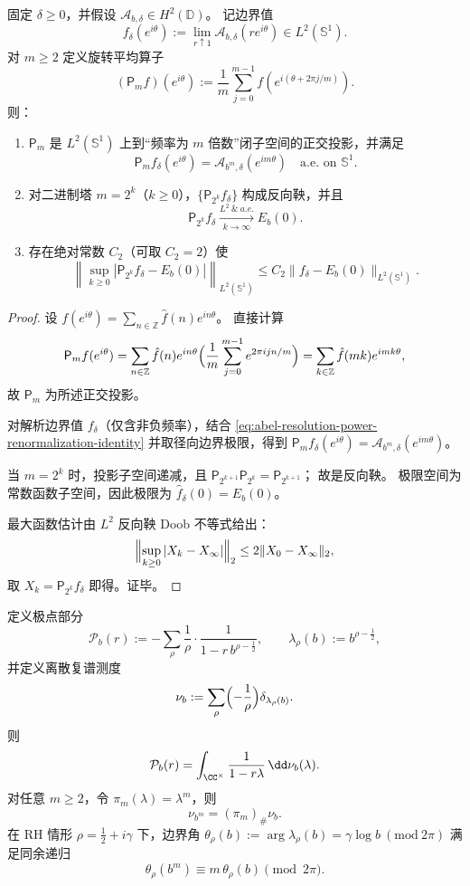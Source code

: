 \begin{theorem}\label{thm:abel-hardy-projection-tower-reverse-martingale}
固定 \(\delta\ge 0\)，并假设 \(\mathcal A_{b,\delta}\in H^2(\mathbb D)\)。
记边界值
\[
f_\delta(e^{i\theta}):=\lim_{r\uparrow 1}\mathcal A_{b,\delta}(re^{i\theta})\in L^2(\mathbb S^1).
\]
对 \(m\ge 2\) 定义旋转平均算子
\[
(\mathsf P_m f)(e^{i\theta})
:=\frac1m\sum_{j=0}^{m-1}f\!\left(e^{i(\theta+2\pi j/m)}\right).
\]
则：
\begin{enumerate}
  \item \(\mathsf P_m\) 是 \(L^2(\mathbb S^1)\) 上到“频率为 \(m\) 倍数”闭子空间的正交投影，并满足
  \[
  \mathsf P_m f_\delta(e^{i\theta})=\mathcal A_{b^m,\delta}(e^{im\theta})
  \quad\text{a.e. on }\mathbb S^1.
  \]
  \item 对二进制塔 \(m=2^k\)（\(k\ge 0\)），\(\{\mathsf P_{2^k}f_\delta\}\) 构成反向鞅，并且
  \[
  \mathsf P_{2^k}f_\delta \xrightarrow[k\to\infty]{L^2\ \&\ a.e.} E_b(0).
  \]
  \item 存在绝对常数 \(C_2\)（可取 \(C_2=2\)）使
  \[
  \left\|\sup_{k\ge 0}\left|\mathsf P_{2^k}f_\delta-E_b(0)\right|\right\|_{L^2(\mathbb S^1)}
  \le
  C_2\|f_\delta-E_b(0)\|_{L^2(\mathbb S^1)}.
  \]
\end{enumerate}
\end{theorem}

\begin{proof}
设
\(
f(e^{i\theta})=\sum_{n\in\mathbb Z}\hat f(n)e^{in\theta}
\)。
直接计算
\[
\mathsf P_m f(e^{i\theta})
=\sum_{n\in\mathbb Z}\hat f(n)e^{in\theta}
\Bigl(\frac1m\sum_{j=0}^{m-1}e^{2\pi ijn/m}\Bigr)
=\sum_{k\in\mathbb Z}\hat f(mk)e^{imk\theta},
\]
故 \(\mathsf P_m\) 为所述正交投影。

对解析边界值 \(f_\delta\)（仅含非负频率），结合
\eqref{eq:abel-resolution-power-renormalization-identity}
并取径向边界极限，得到
\(
\mathsf P_m f_\delta(e^{i\theta})=\mathcal A_{b^m,\delta}(e^{im\theta})
\)。

当 \(m=2^k\) 时，投影子空间递减，且
\(
\mathsf P_{2^{k+1}}\mathsf P_{2^k}=\mathsf P_{2^{k+1}}
\)；
故是反向鞅。
极限空间为常数函数子空间，因此极限为 \(\hat f_\delta(0)=E_b(0)\)。

最大函数估计由 \(L^2\) 反向鞅 Doob 不等式给出：
\[
\Bigl\|\sup_{k\ge 0}|X_k-X_\infty|\Bigr\|_2\le 2\|X_0-X_\infty\|_2,
\]
取 \(X_k=\mathsf P_{2^k}f_\delta\) 即得。证毕。
\end{proof}

\begin{proposition}[极点谱测度在幂映射下的推前兼容]\label{prop:abel-weil-polar-measure-power-pushforward}
定义极点部分
\[
\mathcal P_b(r):=-\sum_{\rho}\frac1{\rho}\cdot\frac1{1-r\,b^{\rho-\frac12}},
\qquad
\lambda_\rho(b):=b^{\rho-\frac12},
\]
并定义离散复谱测度
\[
\nu_b:=\sum_{\rho}\Bigl(-\frac1{\rho}\Bigr)\delta_{\lambda_\rho(b)}.
\]
则
\[
\mathcal P_b(r)=\int_{\CC^\times}\frac1{1-r\lambda}\,\dd\nu_b(\lambda).
\]
对任意 \(m\ge 2\)，令 \(\pi_m(\lambda)=\lambda^m\)，则
\[
\nu_{b^m}=(\pi_m)_\#\nu_b.
\]
在 RH 情形 \(\rho=\frac12+i\gamma\) 下，边界角
\(
\theta_\rho(b):=\arg\lambda_\rho(b)=\gamma\log b\ (\mathrm{mod}\ 2\pi)
\)
满足同余递归
\[
\theta_\rho(b^m)\equiv m\,\theta_\rho(b)\pmod{2\pi}.
\]
\end{proposition}

